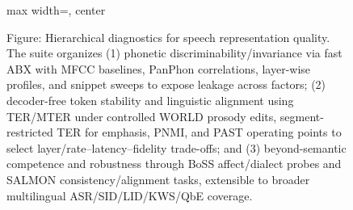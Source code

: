 \begin{figure}[h]
\begin{adjustbox}{max width=\textwidth, center}
\end{adjustbox}

\caption{Figure: Hierarchical diagnostics for speech representation quality. The suite organizes (1) phonetic discriminability/invariance via fast ABX with MFCC baselines, PanPhon correlations, layer-wise profiles, and snippet sweeps to expose leakage across factors; (2) decoder-free token stability and linguistic alignment using TER/MTER under controlled WORLD prosody edits, segment-restricted TER for emphasis, PNMI, and PAST operating points to select layer/rate–latency–fidelity trade-offs; and (3) beyond-semantic competence and robustness through BoSS affect/dialect probes and SALMON consistency/alignment tasks, extensible to broader multilingual ASR/SID/LID/KWS/QbE coverage.}
\label{fig:tiny_tree_figure_1}

\end{figure}